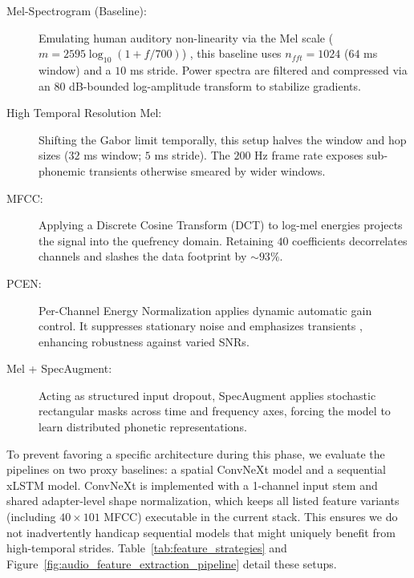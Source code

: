 \documentclass[cameraready]{Interspeech}
\begin{document}
\begin{description}
    \item[Mel-Spectrogram (Baseline):] Emulating human auditory non-linearity via the Mel scale ($m = 2595 \log_{10}(1 + f/700)$) \cite{stevens1937mel}, this baseline uses $n_{fft} = 1024$ ($64$ ms window) and a $10$ ms stride. Power spectra are filtered and compressed via an $80$ dB-bounded log-amplitude transform to stabilize gradients.
    \item[High Temporal Resolution Mel:] Shifting the Gabor limit temporally, this setup halves the window and hop sizes ($32$ ms window; $5$ ms stride). The $200$ Hz frame rate exposes sub-phonemic transients otherwise smeared by wider windows.
    \item[MFCC:] Applying a Discrete Cosine Transform (DCT) to log-mel energies projects the signal into the quefrency domain. Retaining $40$ coefficients decorrelates channels \cite{davis1980mfcc} and slashes the data footprint by $\sim93\%$.
    \item[PCEN:] Per-Channel Energy Normalization \cite{wang2017pcen} applies dynamic automatic gain control. It suppresses stationary noise and emphasizes transients \cite{lostanlen2019pcen}, enhancing robustness against varied SNRs.
    \item[Mel + SpecAugment:] Acting as structured input dropout, SpecAugment \cite{park2019specaugment} applies stochastic rectangular masks across time and frequency axes, forcing the model to learn distributed phonetic representations.
\end{description}

\noindent To prevent favoring a specific architecture during this phase, we evaluate the pipelines on two proxy baselines: a spatial ConvNeXt model and a sequential xLSTM model. ConvNeXt is implemented with a 1-channel input stem and shared adapter-level shape normalization, which keeps all listed feature variants (including $40\times101$ MFCC) executable in the current stack. This ensures we do not inadvertently handicap sequential models that might uniquely benefit from high-temporal strides. Table~\ref{tab:feature_strategies} and Figure~\ref{fig:audio_feature_extraction_pipeline} detail these setups.
\end{document}
